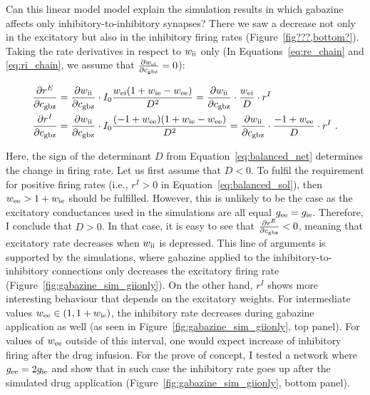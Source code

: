     Can this linear model model explain the simulation results in which
    gabazine affects only inhibitory-to-inhibitory synapses? There we saw a
    decrease not only in the excitatory but also in the inhibitory firing rates
    (Figure~\ref{fig???,bottom?}). Taking the rate derivatives in respect to
    $w_{\rm ii}$ only (In Equations~\ref{eq:re_chain} and \ref{eq:ri_chain}, we
    assume that $\frac{\partial w_{\rm ei}}{\partial c_{\rm gbz}} = 0$):

    \begin{equation}
      \begin{split}
        \frac{\partial r^E}{\partial c_{\rm gbz}} &=
            \frac{\partial w_{\rm ii}}{\partial c_{\rm gbz}} \cdot
            I_0 \frac{w_{\rm ei}(1 + w_{\rm ie} - w_{\rm ee})} {D^2} =
            \frac{\partial w_{\rm ii}}{\partial c_{\rm gbz}} \cdot \frac{w_{\rm ei}}{D} \cdot r^I \\
        \frac{\partial r^I}{\partial c_{\rm gbz}} &=
            \frac{\partial w_{\rm ii}}{\partial c_{\rm gbz}} \cdot
            I_0 \frac{(-1+w_{\rm ee}) (1 + w_{\rm ie} - w_{\rm ee})} {D^2} =
            \frac{\partial w_{\rm ii}}{\partial c_{\rm gbz}} \cdot \frac{-1+w_{\rm ee}}{D} \cdot r^I \,\, . \\
      \end{split}
    \end{equation}
 
    Here, the sign of the determinant $D$ from Equation~\ref{eq:balanced_net}
    determines the change in firing rate. Let us first assume that $D<0$. To
    fulfil the requirement for positive firing rates (i.e., $r^I>0$ in
    Equation~\ref{eq:balanced_sol}), then $w_{\rm ee}>1+w_{\rm ie}$ should be
    fulfilled. However, this is unlikely to be the case as the excitatory
    conductances used in the simulations are all equal $g_{\rm ee}=g_{\rm ie}$.
    Therefore, I conclude that $D>0$. In that case, it is easy to see that
    $\frac{\partial r^E}{\partial c_{\rm gbz}} < 0$, meaning that excitatory
    rate decreases when $w_{\rm ii}$ is depressed. This line of arguments is
    supported by the simulations, where gabazine applied to the
    inhibitory-to-inhibitory connections only decreases the excitatory firing
    rate (Figure~\ref{fig:gabazine_sim_giionly}). On the other hand, $r^I$
    shows more interesting behaviour that depends on the excitatory weights.
    For intermediate values $w_{\rm ee} \in (1, 1+w_{\rm ie})$, the inhibitory
    rate decreases during gabazine application as well (as seen in
    Figure~\ref{fig:gabazine_sim_giionly}, top panel). For values of $w_{\rm
    ee}$ outside of this interval, one would expect increase of inhibitory
    firing after the drug infusion. For the prove of concept, I tested a
    network where $g_{\rm ee}=2 g_{\rm ie}$ and show that in such case the
    inhibitory rate goes up after the simulated drug application
    (Figure~\ref{fig:gabazine_sim_giionly}, bottom panel).

